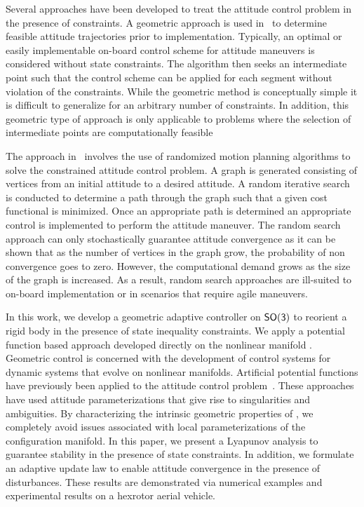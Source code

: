 \documentclass[letterpaper, 10 pt, conference]{ieeeconf}  %
\begin{document}
Several approaches have been developed to treat the attitude control problem in the presence of constraints.
A geometric approach is used in~\cite{hablani1999} to determine feasible attitude trajectories prior to implementation.
Typically, an optimal or easily implementable on-board control scheme for attitude maneuvers is considered without state constraints.
The algorithm then seeks an intermediate point such that the control scheme can be applied for each segment without violation of the constraints.
While the geometric method is conceptually simple it is difficult to generalize for an arbitrary number of constraints.
In addition, this geometric type of approach is only applicable to problems where the selection of intermediate points are computationally feasible

The approach in~\cite{frazzoli2001} involves the use of randomized motion planning algorithms to solve the constrained attitude control problem.
A graph is generated consisting of vertices from an initial attitude to a desired attitude. 
A random iterative search is conducted to determine a path through the graph such that a given cost functional is minimized.
Once an appropriate path is determined an appropriate control is implemented to perform the attitude maneuver.
The random search approach can only stochastically guarantee attitude convergence as it can be shown that as the number of vertices in the graph grow, the probability of non convergence goes to zero.
However, the computational demand grows as the size of the graph is increased. 
As a result, random search approaches are ill-suited to on-board implementation or in scenarios that require agile maneuvers.

In this work, we develop a geometric adaptive controller on \(\mathsf{SO(3)}\) to reorient a rigid body in the presence of state inequality constraints.
We apply a potential function based approach developed directly on the nonlinear manifold \SO.
Geometric control is concerned with the development of control systems for dynamic systems that evolve on nonlinear manifolds.
Artificial potential functions have previously been applied to the attitude control problem~\cite{lee2011b,mcinnes1994}.
These approaches have used attitude parameterizations that give rise to singularities and ambiguities.
By characterizing the intrinsic geometric properties of \SO, we completely avoid issues associated with local parameterizations of the configuration manifold.
In this paper, we present a Lyapunov analysis to guarantee stability in the presence of state constraints.
In addition, we formulate an adaptive update law to enable attitude convergence in the presence of disturbances.
These results are demonstrated via numerical examples and experimental results on a hexrotor aerial vehicle.
\end{document}
